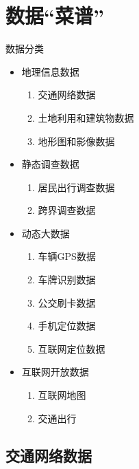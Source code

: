 

\section{数据``菜谱''}

\begin{frame}{数据分类}
\begin{itemize}
\item<1-> 地理信息数据
   \begin{enumerate}
     \item 交通网络数据
     \item 土地利用和建筑物数据
     \item 地形图和影像数据
  \end{enumerate}
\item<2-> 静态调查数据
   \begin{enumerate}
     \item 居民出行调查数据
     \item 跨界调查数据
   \end{enumerate}
\item<3-> 动态大数据
   \begin{enumerate}       
       \item 车辆GPS数据
       \item 车牌识别数据
       \item 公交刷卡数据
       \item 手机定位数据
       \item 互联网定位数据
   \end{enumerate}
\item<4-> 互联网开放数据
   \begin{enumerate}
     \item 互联网地图
     \item 交通出行
  \end{enumerate}
\end{itemize}
\end{frame}

\subsection{交通网络数据}


